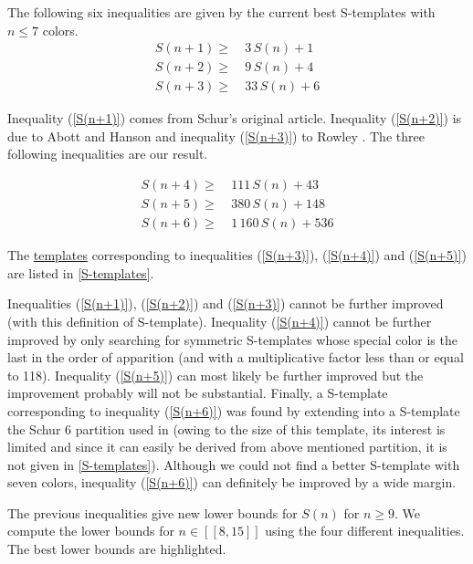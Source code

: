 \par
The following six inequalities are given by the current best S-templates with \(n \leqslant 7\) colors.
\begin{align}
	S(n + 1) \geqslant &~3\,S(n)  + 1 \label{S(n+1)}\\
	S(n + 2) \geqslant &~9\,S(n)  + 4 \label{S(n+2)}\\
	S(n + 3) \geqslant &~33\,S(n) + 6 \label{S(n+3)}
\end{align}

Inequality (\ref{S(n+1)}) comes from  Schur's original article\cite{Schur1917}. Inequality (\ref{S(n+2)}) is due to
Abott and Hanson \cite{AbbottHanson} and inequality (\ref{S(n+3)}) to Rowley \cite{RowleyRamsey}. 
The three following inequalities are our result.

\begin{align}
	S(n + 4) \geqslant &~111\,S(n) + 43 \label{S(n+4)}\\
	S(n + 5) \geqslant &~380\,S(n) + 148 \label{S(n+5)}\\
	S(n + 6) \geqslant &~1\,160\,S(n) + 536 \label{S(n+6)}
\end{align}

\par The \hyperref[S-templates]{templates} corresponding to inequalities (\ref{S(n+3)}), (\ref{S(n+4)}) and 
(\ref{S(n+5)}) are listed in \ref{S-templates}.

\par
Inequalities (\ref{S(n+1)}), (\ref{S(n+2)}) and (\ref{S(n+3)}) cannot be further improved (with this definition of S-template). 
Inequality (\ref{S(n+4)}) cannot be further improved by only searching for symmetric S-templates whose special color is the 
last in the order of apparition (and with a multiplicative factor less than or equal to 118). Inequality (\ref{S(n+5)}) can most 
likely be further improved but the improvement probably will not be substantial. Finally, a S-template corresponding to inequality 
(\ref{S(n+6)}) was found by extending into a S-template the Schur 6 partition used in \cite{rowley2021improved} (owing to the 
size of this template, its interest is limited and since it can easily be derived from above mentioned partition, it is not given in 
\ref{S-templates}). Although we could not find a better S-template with seven colors, inequality (\ref{S(n+6)}) can definitely be 
improved by a wide margin.

\par
The previous inequalities give new lower bounds for \(S(n)\) for
\( n \geqslant 9 \). We compute the lower
bounds for \( n \in [\![8,15]\!] \) using the four different inequalities. The best lower bounds are highlighted.

